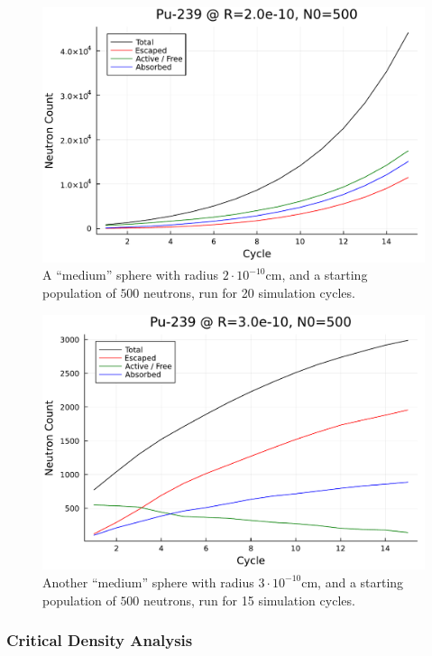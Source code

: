 \begin{figure}[h!]
    \centering
    \includegraphics[scale=0.7]{imgs/neutron-count-plutonium-medium.pdf}
    \caption{A ``medium'' sphere with radius $2 \cdot 10^{-10}$cm, and a starting population of $500$ neutrons, run for 20 simulation 
    cycles.}
\end{figure}

\begin{figure}[h!]
    \centering
    \includegraphics[scale=0.7]{imgs/neutron-count-plutonium-medium-2.pdf}
    \caption{Another ``medium'' sphere with radius $3 \cdot 10^{-10}$cm, and a starting population of $500$ neutrons, run for 15 simulation 
    cycles.}
\end{figure}

\subsubsection{Critical Density Analysis}

